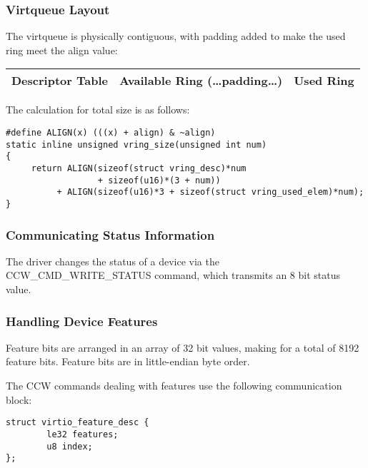 \subsubsection{Virtqueue Layout}\label{sec:Virtio Transport Options / Virtio over channel I/O / Device Initialization / Virtqueue Layout}

The virtqueue is physically contiguous, with padding added to make the
used ring meet the align value:

\begin{tabular}{|l|l|l|}
\hline
Descriptor Table & Available Ring (\ldots padding\ldots) & Used Ring \\
\hline
\end{tabular}

The calculation for total size is as follows:

\begin{lstlisting}
#define ALIGN(x) (((x) + align) & ~align)
static inline unsigned vring_size(unsigned int num)
{
     return ALIGN(sizeof(struct vring_desc)*num
                  + sizeof(u16)*(3 + num))
          + ALIGN(sizeof(u16)*3 + sizeof(struct vring_used_elem)*num);
}
\end{lstlisting}

\subsubsection{Communicating Status Information}\label{sec:Virtio Transport Options / Virtio over channel I/O / Device Initialization / Communicating Status Information}

The driver changes the status of a device via the
CCW_CMD_WRITE_STATUS command, which transmits an 8 bit status
value.

\subsubsection{Handling Device Features}\label{sec:Virtio Transport Options / Virtio over channel I/O / Device Initialization / Handling Device Features}

Feature bits are arranged in an array of 32 bit values, making
for a total of 8192 feature bits. Feature bits are in
little-endian byte order.

The CCW commands dealing with features use the following
communication block:

\begin{lstlisting}
struct virtio_feature_desc {
        le32 features;
        u8 index;
};
\end{lstlisting}

